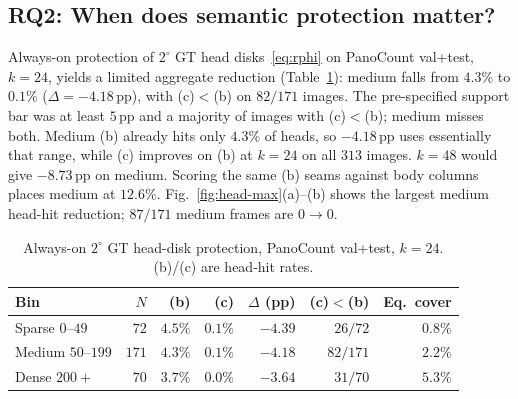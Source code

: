 \subsection{RQ2: When does semantic protection matter?}
\label{sec:head-disks}

Always-on protection of $2^\circ$ GT head disks~\eqref{eq:rphi}
on PanoCount val+test, $k=24$, yields a limited aggregate
reduction (Table~\ref{tab:head-disks}): medium falls from
$4.3\%$ to $0.1\%$ ($\Delta=-4.18$\,pp), with (c)$<$(b) on
$82/171$ images. The pre-specified support bar was at least
$5$\,pp and a majority of images with (c)$<$(b); medium misses
both. Medium (b) already hits only $4.3\%$ of heads, so
$-4.18$\,pp uses essentially that range, while (c) improves on
(b) at $k=24$ on all $313$ images. $k=48$ would give $-8.73$\,pp
on medium. Scoring the same (b) seams against body columns
places medium at $12.6\%$. Fig.~\ref{fig:head-max}(a)--(b) shows
the largest medium head-hit reduction; $87/171$ medium frames are
$0\to 0$.

\begin{table}[!b]
\centering
\caption{Always-on $2^\circ$ GT head-disk protection, PanoCount
val+test, $k=24$. (b)/(c) are head-hit rates.}
\label{tab:head-disks}
\setlength{\tabcolsep}{3.5pt}
\small
\begin{tabular}{lrrrrrr}
\toprule
Bin & $N$ & (b) & (c) & $\Delta$ (pp) & (c)$<$(b) & Eq.\ cover \\
\midrule
Sparse $0$--$49$ & $72$ & $4.5\%$ & $0.1\%$ & $-4.39$ & $26/72$ & $0.8\%$ \\
Medium $50$--$199$ & $171$ & $4.3\%$ & $0.1\%$ & $-4.18$ & $82/171$ & $2.2\%$ \\
Dense $200+$ & $70$ & $3.7\%$ & $0.0\%$ & $-3.64$ & $31/70$ & $5.3\%$ \\
\bottomrule
\end{tabular}
\end{table}

